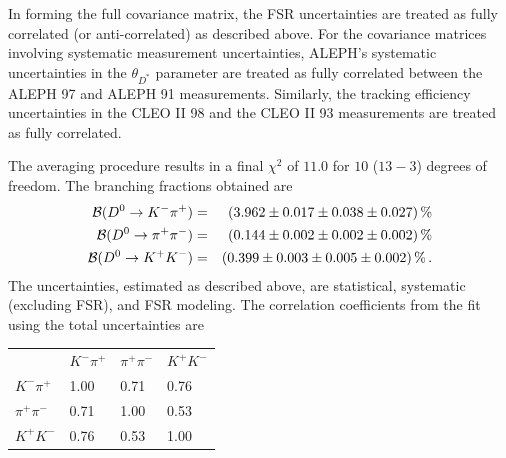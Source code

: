 In forming the full covariance matrix, the FSR
uncertainties are treated as fully correlated (or anti-correlated) as 
described above.  %
For the covariance matrices involving systematic measurement uncertainties, ALEPH's systematic %
uncertainties in the $\theta_{D^*}$ parameter are treated
as fully correlated between the ALEPH 97 and ALEPH 91 measurements.  Similarly,
the tracking efficiency uncertainties in the CLEO II 98 and the
CLEO II 93 measurements are treated as fully correlated.  

The averaging procedure results in a 
final $\chi^2$ of $11.0$ for $10$ ($13-3$) degrees 
of freedom.  The branching
fractions obtained are
\begin{eqnarray*}
  {\cal B}(D^0\to K^-\pi^+)   & = & ( 3.962 \pm 0.017 \pm 0.038 \pm 0.027 )\,\% \\
  {\cal B}(D^0\to \pi^+\pi^-) & = & ( 0.144 \pm 0.002 \pm 0.002 \pm 0.002 )\,\% \\
  {\cal B}(D^0\to K^+ K^-)    & = & ( 0.399 \pm 0.003 \pm 0.005 \pm 0.002 )\,\%\,. 
\end{eqnarray*}The uncertainties, estimated as described above, are statistical, 
systematic (excluding FSR), and
FSR modeling.  The correlation coefficients from the fit using the 
total uncertainties are
\begin{center}
\begin{tabular}{llll}
               & $K^-\pi^+$ & $\pi^+\pi^-$ & $K^+ K^-$ \\
$K^-\pi^+$     &  1.00 & 0.71 & 0.76  \\
$\pi^+\pi^-$   &  0.71 & 1.00 & 0.53  \\
$K^+ K^-$      &  0.76 & 0.53 & 1.00  \\
\end{tabular}
\end{center}

